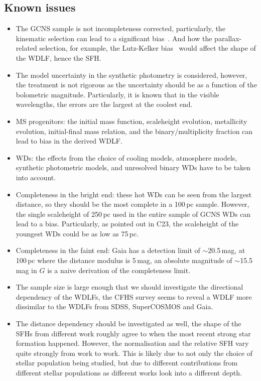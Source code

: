 \documentclass[fleqn,usenatbib]{mnras}
\begin{document}
\subsection{Known issues}
\begin{itemize}
    \item The GCNS sample is not incompleteness corrected, particularly, the
    kinematic selection can lead to a significant 
    bias~\citep{2015MNRAS.450.4098L}. And how the parallax-related selection,
    for example, the Lutz-Kelker bias~\citep{1973PASP...85..573L} would affect
    the shape of the WDLF, hence the SFH.
    \item The model uncertainty in the synthetic photometry is considered,
    however, the treatment is not rigorous as the uncertainty should be as
    a function of the bolometric magnitude. Particularly, it is known that
    in the visible wavelengths, the errors are the largest at the coolest end.
    \item MS progenitors: the initial mass function, scaleheight evolution,
    metallicity evolution, initial-final mass relation, and the
    binary/multiplicity fraction can lead to bias in the derived WDLF.
    \item WDs: the effects from the choice of cooling models, atmosphere
    models, synthetic photometric models, and unresolved binary WDs have to be
    taken into account.
    \item Completeness in the bright end: these hot WDs can be seen from the
    largest distance, so they should be the most complete in a 100\,pc
    sample. However, the single scaleheight of 250\,pc used in the entire
    sample of GCNS WDs can lead to a bias. Particularly, as pointed out in
    C23, the scaleheight of the youngest WDs could be
    as low as 75\,pc.
    \item Completeness in the faint end: Gaia has a detection limit of
    $\sim$20.5\,mag, at 100\,pc where the distance modulus is 5\,mag, an
    absolute magnitude of $\sim$15.5\,mag in $G$ is a naive derivation of the
    completeness limit.
    \item The sample size is large enough that we should investigate the
    directional dependency of the WDLFs, the CFHS survey seems to reveal a
    WDLF more dissimilar to the WDLFs from SDSS, SuperCOSMOS and Gaia.
    \item The distance dependency should be investigated as well, the shape of
    the SFHs from different work roughly agree to when the most recent strong
    star formation happened. However, the normalisation and the relative SFH
    vary quite strongly from work to work. This is likely due to not only the
    choice of stellar population being studied, but due to different
    contributions from different stellar populations as different works look
    into a different depth.
\end{itemize}
\end{document}
